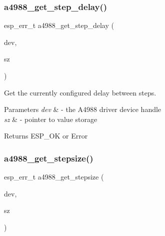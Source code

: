 \subsubsection{\texorpdfstring{a4988\+\_\+get\+\_\+step\+\_\+delay()}{a4988\_get\_step\_delay()}}
{\footnotesize\ttfamily esp\+\_\+err\+\_\+t a4988\+\_\+get\+\_\+step\+\_\+delay (\begin{DoxyParamCaption}\item[{\hyperlink{group__A4988__definitions_ga16590a9dd79ad8fcf4c317be2659b6c5}{A4988\+\_\+\+D\+EV}}]{dev,  }\item[{\hyperlink{vl53l0x__types_8h_a273cf69d639a59973b6019625df33e30}{uint16\+\_\+t} $\ast$}]{sz }\end{DoxyParamCaption})}



Get the currently configured delay between steps. 


\begin{DoxyParams}{Parameters}
{\em dev} & -\/ the A4988 driver device handle \\
\hline
{\em sz} & -\/ pointer to value storage \\
\hline
\end{DoxyParams}
\begin{DoxyReturn}{Returns}
E\+S\+P\+\_\+\+OK or Error 
\end{DoxyReturn}
\mbox{\label{group__A4988__Driver__functions_gab5150822a8c40c8bbf66fc67c4ad43a7}} 
\subsubsection{\texorpdfstring{a4988\+\_\+get\+\_\+stepsize()}{a4988\_get\_stepsize()}}
{\footnotesize\ttfamily esp\+\_\+err\+\_\+t a4988\+\_\+get\+\_\+stepsize (\begin{DoxyParamCaption}\item[{\hyperlink{group__A4988__definitions_ga16590a9dd79ad8fcf4c317be2659b6c5}{A4988\+\_\+\+D\+EV}}]{dev,  }\item[{\hyperlink{vl53l0x__types_8h_aba7bc1797add20fe3efdf37ced1182c5}{uint8\+\_\+t} $\ast$}]{sz }\end{DoxyParamCaption})}




